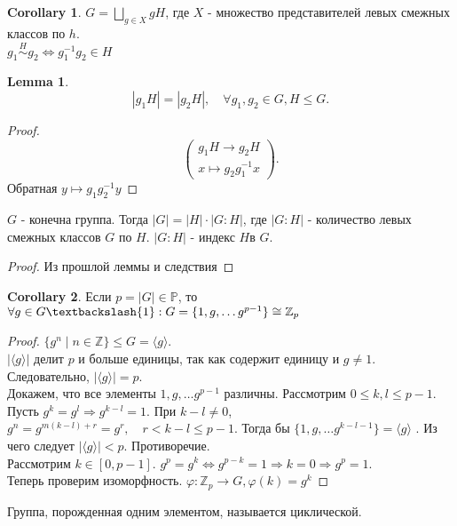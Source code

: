 \documentclass[11pt]{book}
\newcommand{\Z}{\mathbb{Z}}
\newcommand{\Pm}{\mathbb{P}}
\theoremstyle{definition}
\theoremstyle{plain}
\theoremstyle{plain}
\newtheorem*{lm}{Lemma}
\theoremstyle{definition}
\newtheorem*{cor}{Corollary}
\theoremstyle{remark}
\begin{document}
\begin{cor}
    $G =\bigsqcup\limits_{g \in X} g H $, где $X$ - множество представителей левых смежных классов по $h$. \\
    $g_1 \stackrel{H}\sim g_2 \Leftrightarrow g_1^{-1} g_2 \in H$
\end{cor}
\begin{lm}
    \[
    |g_1H| = |g_2H|, \quad \forall g_1, g_2 \in  G, H \le G 
    .\] 
\end{lm}
\begin{proof}
     \[
     \left ( 
     \begin{array}{c}
     g_1H \to g_2H \\
     x \mapsto g_2 g_1^{-1} x
     \end{array}
     \right )
     .\] 
     Обратная $y \mapsto g_1 g_2^{-1} y$
\end{proof}
\begin{thm}[Лагранж]
    $G$ - конечна группа. Тогда $|G| = |H|\cdot  |G:H|$, где $|G:H|$ - количество левых смежных классов $G$ по $H$. $|G:H|$ - индекс $H$в $G$.
\end{thm}
\begin{proof}
    Из прошлой леммы и следствия
\end{proof}
\begin{cor}
    Если $p = |G| \in  \Pm$, то $\forall g \in  G \textbackslash {1}: G = \{1, g, \ldots g^{p-1}\} \cong \Z_p$
\end{cor}
\begin{proof}
    $\{g^n\mid n \in  \Z\} \le G = \langle g \rangle$. \\
    $|\langle g \rangle|$ делит $p$ и больше единицы, так как содержит единицу и $g \ne 1$. Следовательно, $|\langle g \rangle|=p$. \\
    Докажем, что все элементы $1, g, \ldots g^{p-1}$ различны. Рассмотрим $0 \le k, l \le p -1$.
    Пусть $g^k = g^l \Rightarrow g^{k-l} = 1$. При $k - l \ne 0$, $g^n = g^{m(k-l) + r} = g^r, \quad r < k -l \le p-1$. 
    Тогда бы $\{1, g, \ldots g^{k-l-1}\} = \langle g \rangle$ . Из чего следует $| \langle g \rangle| < p$. Противоречие.\\
    Рассмотрим $k \in  [0, p-1]$.
    $g^p = g^k \Leftrightarrow g^{p-k} = 1 \Rightarrow k = 0 \Rightarrow g^p = 1$.\\
    Теперь проверим изоморфность.
    $\varphi : \Z_p \to G, \varphi (k) = g^k$
\end{proof}
\begin{defn}
    Группа, порожденная одним элементом, называется циклической.
\end{defn}
\end{document}
